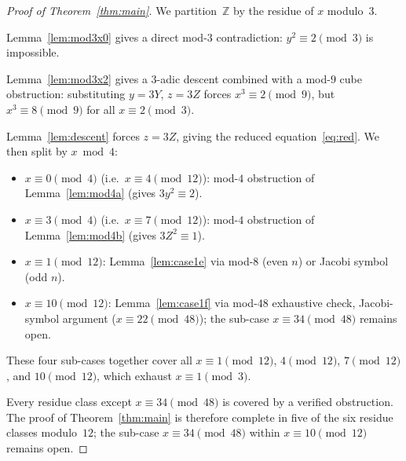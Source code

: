 \documentclass[12pt, a4paper]{amsart}
\theoremstyle{plain}
\theoremstyle{definition}
\begin{document}
\begin{proof}[Proof of Theorem~\ref{thm:main}]
  We partition~$\mathbb{Z}$ by the residue of $x$ modulo~$3$.

  \begin{description}[leftmargin=2em, labelwidth=3.5cm]
    \item[$x \equiv 0 \pmod{3}$:]
      Lemma~\ref{lem:mod3x0} gives a direct mod-$3$ contradiction:
      $y^2 \equiv 2 \pmod{3}$ is impossible.

    \item[$x \equiv 2 \pmod{3}$:]
      Lemma~\ref{lem:mod3x2} gives a 3-adic descent combined with a
      mod-$9$ cube obstruction: substituting $y=3Y$, $z=3Z$ forces
      $x^3 \equiv 2 \pmod{9}$, but $x^3 \equiv 8 \pmod{9}$ for all
      $x \equiv 2 \pmod{3}$.

    \item[$x \equiv 1 \pmod{3}$:]
      Lemma~\ref{lem:descent} forces $z = 3Z$, giving the reduced
      equation~\eqref{eq:red}.  We then split by $x \bmod 4$:
      \begin{itemize}
        \item $x \equiv 0 \pmod{4}$ (i.e.\ $x \equiv 4 \pmod{12}$):
              mod-$4$ obstruction of Lemma~\ref{lem:mod4a} (gives $3y^2 \equiv 2$).
        \item $x \equiv 3 \pmod{4}$ (i.e.\ $x \equiv 7 \pmod{12}$):
              mod-$4$ obstruction of Lemma~\ref{lem:mod4b} (gives $3Z^2 \equiv 1$).
        \item $x \equiv 1 \pmod{12}$:
              Lemma~\ref{lem:case1e} via mod-$8$ (even $n$) or Jacobi symbol
              (odd $n$).
        \item $x \equiv 10 \pmod{12}$:
              Lemma~\ref{lem:case1f} via mod-$48$ exhaustive check,
              Jacobi-symbol argument ($x \equiv 22 \pmod{48}$); the
              sub-case $x \equiv 34 \pmod{48}$ remains open.
      \end{itemize}
      These four sub-cases together cover all $x \equiv 1 \pmod{12}$,
      $4 \pmod{12}$, $7 \pmod{12}$, and $10 \pmod{12}$, which exhaust
      $x \equiv 1 \pmod{3}$.
  \end{description}

  Every residue class except $x \equiv 34 \pmod{48}$ is covered by a
  verified obstruction.  The proof of Theorem~\ref{thm:main} is therefore
  complete in five of the six residue classes modulo~$12$; the sub-case
  $x \equiv 34 \pmod{48}$ within $x \equiv 10 \pmod{12}$ remains open.
\end{proof}
\end{document}
